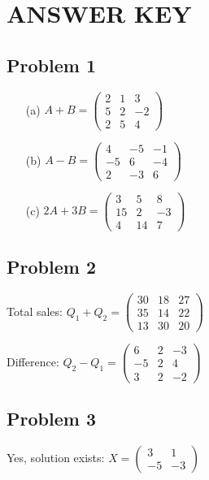 \documentclass[11pt]{article}
\begin{document}
\section*{ANSWER KEY}

\subsection*{Problem 1}
\begin{enumerate}
\item[(a)] $A + B = \begin{pmatrix} 2 & 1 & 3 \\ 5 & 2 & -2 \\ 2 & 5 & 4 \end{pmatrix}$
\item[(b)] $A - B = \begin{pmatrix} 4 & -5 & -1 \\ -5 & 6 & -4 \\ 2 & -3 & 6 \end{pmatrix}$
\item[(c)] $2A + 3B = \begin{pmatrix} 3 & 5 & 8 \\ 15 & 2 & -3 \\ 4 & 14 & 7 \end{pmatrix}$
\end{enumerate}

\subsection*{Problem 2}
Total sales: $Q_1 + Q_2 = \begin{pmatrix} 30 & 18 & 27 \\ 35 & 14 & 22 \\ 13 & 30 & 20 \end{pmatrix}$

Difference: $Q_2 - Q_1 = \begin{pmatrix} 6 & 2 & -3 \\ -5 & 2 & 4 \\ 3 & 2 & -2 \end{pmatrix}$

\subsection*{Problem 3}
Yes, solution exists: $X = \begin{pmatrix} 3 & 1 \\ -5 & -3 \end{pmatrix}$
\end{document}
